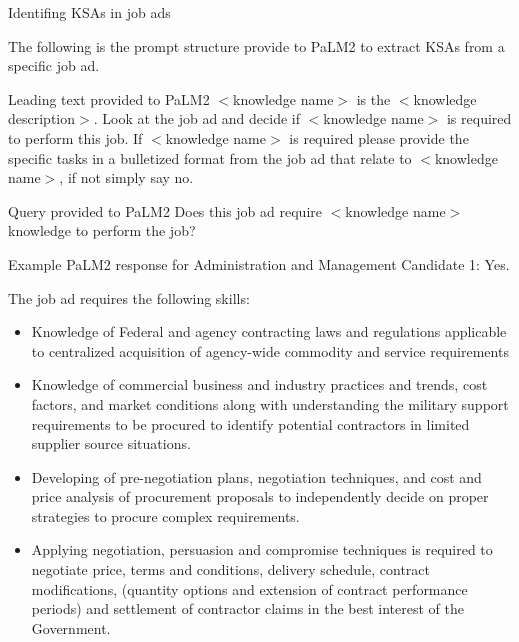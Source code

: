 \documentclass{beamer}
\begin{document}

\begin{frame}{Identifing KSAs in job ads}

  The following is the prompt structure provide to PaLM2 to extract KSAs from a specific job ad.

  \begin{exampleblock}{Leading text provided to PaLM2}
    $<$knowledge name$>$ is the $<$knowledge description$>$. Look at the job ad and decide if $<$knowledge name$>$ is required to perform this job. If $<$knowledge name$>$ is required please provide the specific tasks in a bulletized format from the job ad that relate to $<$knowledge name$>$, if not simply say no.
  \end{exampleblock}
  \begin{exampleblock}{Query provided to PaLM2}
    Does this job ad require $<$knowledge name$>$ knowledge to perform the job?
  \end{exampleblock}
  
\end{frame}


\begin{frame}{Example PaLM2 response for Administration and Management}
  \scriptsize
  Candidate 1: Yes.

  The job ad requires the following skills:

  \begin{itemize}
    \item Knowledge of Federal and agency contracting laws and regulations applicable to centralized acquisition of agency-wide commodity and service requirements
    \item Knowledge of commercial business and industry practices and trends, cost factors, and market conditions along with understanding the military support requirements to be procured to identify potential contractors in limited supplier source situations.
    \item Developing of pre-negotiation plans, negotiation techniques, and cost and price analysis of procurement proposals to independently decide on proper strategies to procure complex requirements.
    \item Applying negotiation, persuasion and compromise techniques is required to negotiate price, terms and conditions, delivery schedule, contract modifications, (quantity options and extension of contract performance periods) and settlement of contractor claims in the best interest of the Government.
  \end{itemize}
  
\end{frame}
\end{document}
